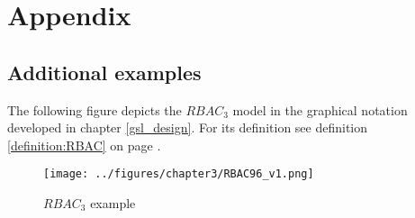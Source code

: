 \documentclass[twoside, openright, 12pt]{book}
\begin{document}
\cleardoublepage
{}
\renewcommand{\thesection}{\Alph{section}}
\chapter*{Appendix}
\label{appendix}
\section{Additional examples}
The following figure depicts the $RBAC_3$ model in the graphical notation developed in chapter \ref{gsl_design}.
For its definition see definition \ref{definition:RBAC} on page \pageref{definition:RBAC}.

\begin{figure}[htb]
	\centering
	\texttt{[image: ../figures/chapter3/RBAC96\_v1.png]}
	\caption{$RBAC_3$ example}
	\label{fig:RBAC96_example}
\end{figure}



\cleardoublepage
\DeclareRobustCommand{\citeext}[1]{\citeauthor{#1}~\cite{#1}}




\end{document}
